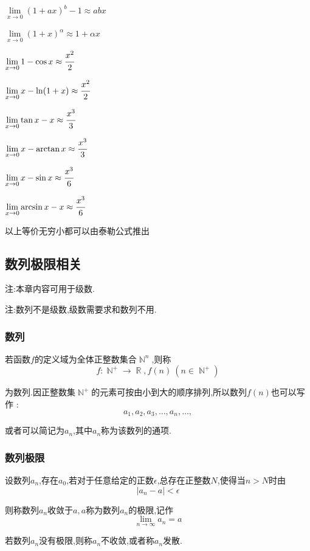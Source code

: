 \documentclass[UTF8,12pt]{ctexbook}
\newcommand{\limNormal}[1]{\lim\limits_{#1}}
\newcommand{\myLimToZero}{\limNormal{x \to 0}}
\newcommand{\defFunction}[1]{f(#1)}
\newcommand{\absoluteValue}[1]{\left\lvert #1 \right\vert}
\DeclareMathOperator{\mathRealNumberCollection}{\mathbb{R}}
\DeclareMathOperator{\mathNatureNumberCollection}{\mathbb{N}}
\begin{document}
{{{{    $\myLimToZero (1 + ax)^b - 1 \approx abx$

    $\myLimToZero (1+x)^\alpha \approx 1+\alpha x$

    $\myLimToZero 1 - \cos x \approx \cfrac{x^2}{2}$

    $\myLimToZero x - \ln(1 + x) \approx \cfrac{x^2}{2}$

    $\myLimToZero \tan x - x \approx \cfrac{x^3}{3}$

    $\myLimToZero x - \arctan x \approx \cfrac{x^3}{3}$

    $\myLimToZero x - \sin x \approx \cfrac{x^3}{6}$

    $\myLimToZero \arcsin x - x \approx \cfrac{x^3}{6}$

    以上等价无穷小都可以由泰勒公式推出
  }%

}%

\subsection{数列极限相关}{

  注:本章内容可用于级数.

  注:数列不是级数,级数需要求和数列不用.

  \subsubsection{数列}{
    若函数$f$的定义域为全体正整数集合$\mathNatureNumberCollection^n$,则称
    $$
      f : \mathNatureNumberCollection^+ \to \mathRealNumberCollection,\defFunction{n} \ (n \in \mathNatureNumberCollection^+)
    $$

    为数列.因正整数集$\mathNatureNumberCollection^+$的元素可按由小到大的顺序排列,所以数列$\defFunction{n}$也可以写作 :
    $$
      a_1,a_2,a_3,\dots,a_n,\dots,
    $$

    或者可以简记为${a_n}$,其中$a_n$称为该数列的通项.
  }%

  \subsubsection{数列极限}{
    设数列${a_n}$,存在$a_0$,若对于任意给定的正数$\epsilon$,总存在正整数$N$,使得当$n > N$时由
    $$
      \absoluteValue{a_n - a} < \epsilon
    $$

    则称数列${a_n}$收敛于$a,a$称为数列$a_n$的极限,记作
    $$
      \limNormal{n \to \infty}a_n = a
    $$

    若数列${a_n}$没有极限,则称${a_n}$不收敛,或者称${a_n}$发散.

}}}}
\end{document}
